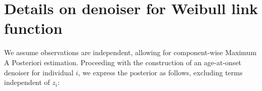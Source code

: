 




\clearpage

\section{Details on denoiser for Weibull link function}
\label{sec:sup1}


We assume observations are independent, allowing for component-wise Maximum A Posteriori estimation. Proceeding with the construction of an age-at-onset denoiser for individual $i$, we express the posterior as follows, excluding terms independent of $z_i$:


